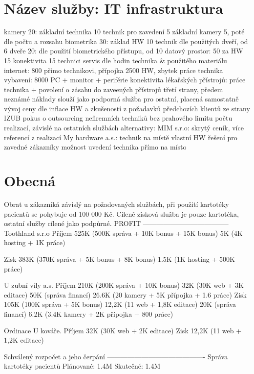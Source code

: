 \documentclass[11pt, a4paper, titlepage]{article}
\begin{document}
	\section*{Název služby: IT infrastruktura}
		kamery 20:
			základní technika 10
			technik pro zavedení 5
			základní kamery 5, poté dle počtu a rozsahu
		biometrika 30:
			základ HW 10
			technik dle použitých dveří, od 6
		dveře 20:
			dle použití biometrického přístupu, od 10
		datový prostor:
			50 za HW
			15 konektivita
			15 technici
			servis dle hodin technika \& použitého materiálu
		internet:
			800 přímo technikovi, přípojka 2500 HW, zbytek práce technika
		vybavení:
			8000 PC + monitor + periférie
		konektivita lékařských přístrojů:
			práce technika + povolení o zásahu do zaveených přístrojů třetí strany, předem neznámé náklady
		slouží jako podporná služba pro ostatní, placená samostatně
		vývoj ceny dle inflace HW a zkušeností z požadavků předchozích klientů
		ze strany IZUB pokus o outsourcing nefiremních techniků
		bez prahového limitu počtu realizací, závislé na ostatních službách
		alternativy:
			MIM s.r.o:
				skrytý ceník, více referencí z realizací
			My hardware a.s.:
				technik na místě
				vlastní HW řešení
		pro zavedné zákazníky možnost uvedení technika přímo na místo

	\section*{Obecná}
		Obrat u zákazníká závislý na požadovaných službách, při použití kartotéky pacientů se pohybuje od 100 000 Kč.
		Cíleně zisková služba je pouze kartotéka, ostatní služby cílené jako podpůrné.
		PROFIT
		--------------------------------------
		Toothland s.r.o 
			Příjem
				525K (500K správa + 10K bonus + 15K bonus)
				5K (4K hosting + 1K práce)

			Zisk
				383K (370K správa + 5K bonus + 8K bonus)
				1.5K (1K hosting + 500K práce)

		U zubní víly a.s.
			Příjem
				210K (200K správa + 10K bonus)
				32K (30K web + 3K editace)
				50K (správa financí)
				26.6K (20 kamery + 5K přípojka + 1.6 práce)
			Zisk
				105K (100K správa + 5K bonus)
				12,2K (11 web + 1,8K editace)
				20K (správa financí)
				6.2K (3.4K kamery + 2K přípojka + 800 práce)

		Ordinace U kováře. 
			Příjem
				32K (30K web + 2K editace)
			Zisk
				12,2K (11 web + 1,2K editace)

		Schválený rozpočet a jeho čerpání
		-------------------------------------------
		Správa kartotéky pacientů
			Plánované: 1.4M
			Skutečné: 1.4M
\end{document}
